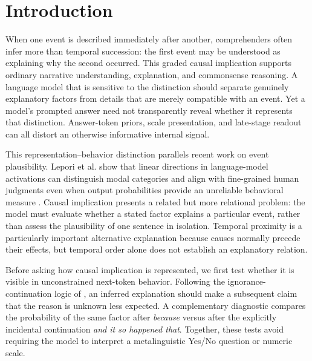 \section{Introduction}
\label{sec:introduction}

When one event is described immediately after another, comprehenders often infer more than temporal succession: the first event may be understood as explaining why the second occurred. This graded causal implication supports ordinary narrative understanding, explanation, and commonsense reasoning. A language model that is sensitive to the distinction should separate genuinely explanatory factors from details that are merely compatible with an event. Yet a model's prompted answer need not transparently reveal whether it represents that distinction. Answer-token priors, scale presentation, and late-stage readout can all distort an otherwise informative internal signal.

This representation--behavior distinction parallels recent work on event plausibility. Lepori et al. show that linear directions in language-model activations can distinguish modal categories and align with fine-grained human judgments even when output probabilities provide an unreliable behavioral measure \citep{lepori2026fantasy}. Causal implication presents a related but more relational problem: the model must evaluate whether a stated factor explains a particular event, rather than assess the plausibility of one sentence in isolation. Temporal proximity is a particularly important alternative explanation because causes normally precede their effects, but temporal order alone does not establish an explanatory relation.

Before asking how causal implication is represented, we first test whether it is visible in unconstrained next-token behavior. Following the ignorance-continuation logic of \citet{pan-kehler-2025-pragmatic}, an inferred explanation should make a subsequent claim that the reason is unknown less expected. A complementary diagnostic compares the probability of the same factor after \emph{because} versus after the explicitly incidental continuation \emph{and it so happened that}. Together, these tests avoid requiring the model to interpret a metalinguistic Yes/No question or numeric scale.

